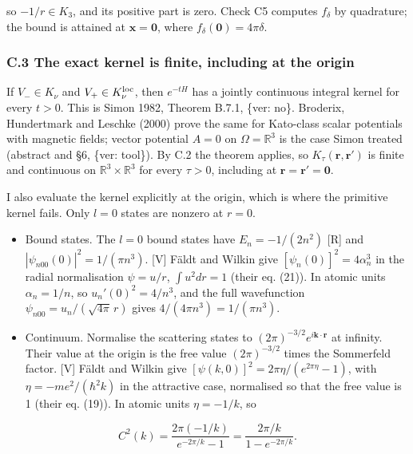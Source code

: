 \documentclass[11pt,a4paper]{article}
\newcommand{\tagmark}[1]{\marginnote{\scriptsize\ttfamily #1}}
\providecommand{\tightlist}{\setlength{\itemsep}{0pt}\setlength{\parskip}{0pt}}
\begin{document}
so \(-1/r\in K_3\), and its positive part is zero. Check C5 computes \(f_\delta\) by quadrature; the bound is attained at \(\mathbf x=\mathbf 0\), where \(f_\delta(\mathbf 0)=4\pi\delta\).

\hypertarget{c.3-the-exact-kernel-is-finite-including-at-the-origin}{%
\subsubsection{C.3 The exact kernel is finite, including at the origin}\label{c.3-the-exact-kernel-is-finite-including-at-the-origin}}

\tagmark{[S]} If \(V_-\in K_\nu\) and \(V_+\in K_\nu^{\rm loc}\), then \(e^{-tH}\) has a jointly continuous integral kernel for every \(t>0\). This is Simon 1982, Theorem B.7.1, \{ver: no\}. Broderix, Hundertmark and Leschke (2000) prove the same for Kato-class scalar potentials with magnetic fields; vector potential \(A=0\) on \(\Omega=\mathbb R^3\) is the case Simon treated (abstract and §6, \{ver: tool\}). By C.2 the theorem applies, so \(K_\tau(\mathbf r,\mathbf r')\) is finite and continuous on \(\mathbb R^3\times\mathbb R^3\) for every \(\tau>0\), including at \(\mathbf r=\mathbf r'=\mathbf 0\).

\tagmark{[D, from recalled inputs]} I also evaluate the kernel explicitly at the origin, which is where the primitive kernel fails. Only \(l=0\) states are nonzero at \(r=0\).

\begin{itemize}
\tightlist
\item
  Bound states. The \(l=0\) bound states have \(E_n=-1/(2n^2)\) {[}R{]} and \(|\psi_{n00}(0)|^2=1/(\pi n^3)\). {[}V{]} Fäldt and Wilkin give \([\psi_n(0)]^2=4\alpha_n^3\) in the radial normalisation \(\psi=u/r\), \(\int u^2dr=1\) (their eq. (21)). In atomic units \(\alpha_n=1/n\), so \(u_n'(0)^2=4/n^3\), and the full wavefunction \(\psi_{n00}=u_n/(\sqrt{4\pi}\,r)\) gives \(4/(4\pi n^3)=1/(\pi n^3)\).
\item
  Continuum. Normalise the scattering states to \((2\pi)^{-3/2}e^{i\mathbf k\cdot\mathbf r}\) at infinity. Their value at the origin is the free value \((2\pi)^{-3/2}\) times the Sommerfeld factor. {[}V{]} Fäldt and Wilkin give \([\psi(k,0)]^2=2\pi\eta/(e^{2\pi\eta}-1)\), with \(\eta=-me^2/(\hbar^2k)\) in the attractive case, normalised so that the free value is 1 (their eq. (19)). In atomic units \(\eta=-1/k\), so
\end{itemize}

\begin{equation}
C^2(k)=\frac{2\pi(-1/k)}{e^{-2\pi/k}-1}=\frac{2\pi/k}{1-e^{-2\pi/k}} .\tag{C4}
\end{equation}
\end{document}
